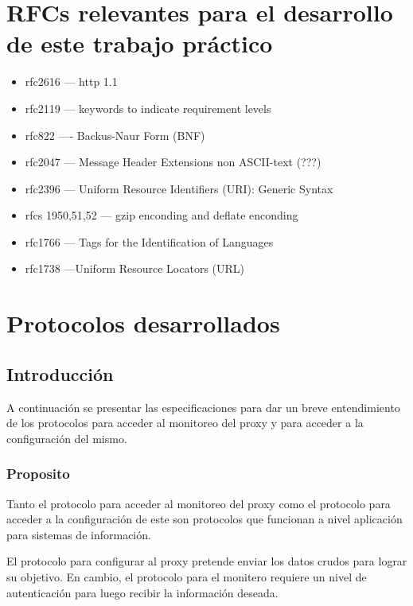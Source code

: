 \documentclass[a4paper,10pt]{article}
\begin{document}
\section{RFCs relevantes para el desarrollo de este trabajo pr\'actico}
\begin{itemize}
 \item rfc2616 --- http 1.1
 \item rfc2119 --- keywords to indicate requirement levels
 \item rfc822 ---- Backus-Naur Form (BNF)
 \item rfc2047 --- Message Header Extensions non ASCII-text (???)
 \item rfc2396 --- Uniform Resource Identifiers (URI): Generic Syntax

 \item rfcs 1950,51,52 --- gzip enconding and deflate enconding
 \item rfc1766 --- Tags for the Identification of Languages
 \item rfc1738 ---Uniform Resource Locators (URL)
\end{itemize}


\newpage
\section{Protocolos desarrollados}

\subsection{Introducci\'on}

A continuación se presentar las especificaciones para dar un breve entendimiento 
de los protocolos para acceder al monitoreo del proxy y para acceder a la configuraci\'on del mismo.

\subsubsection{Proposito}

Tanto el protocolo para acceder al monitoreo del proxy como el protocolo para acceder a la 
configuración de este son protocolos que funcionan a nivel aplicación para sistemas de informaci\'on.

El protocolo para configurar al proxy pretende enviar los datos crudos para lograr su objetivo. En cambio, 
el protocolo para el monitero requiere un nivel de autenticaci\'on para luego recibir la informaci\'on 
deseada. 
\end{document}
